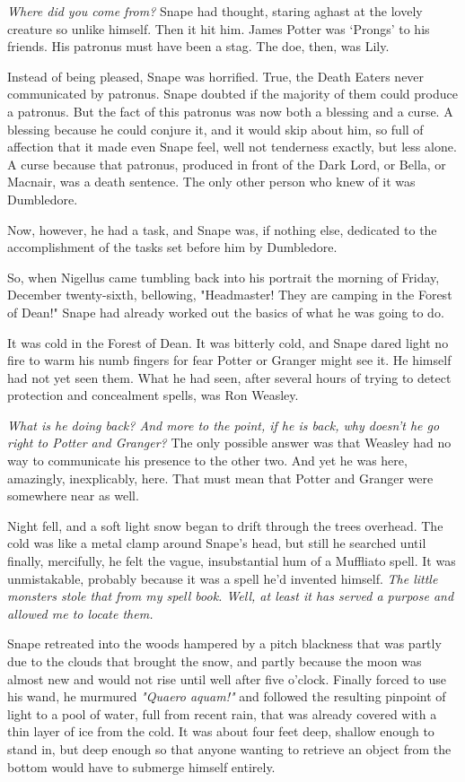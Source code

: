 \documentclass[a4paper,11pt]{article}
\begin{document}
\emph{Where did you come from?} Snape had thought, staring aghast at the lovely creature so unlike himself. Then it hit him. James Potter was `Prongs' to his friends. His patronus must have been a stag. The doe, then, was Lily.

Instead of being pleased, Snape was horrified. True, the Death Eaters never communicated by patronus. Snape doubted if the majority of them could produce a patronus. But the fact of this patronus was now both a blessing and a curse. A blessing because he could conjure it, and it would skip about him, so full of affection that it made even Snape feel, well not tenderness exactly, but less alone. A curse because that patronus, produced in front of the Dark Lord, or Bella, or Macnair, was a death sentence. The only other person who knew of it was Dumbledore.

Now, however, he had a task, and Snape was, if nothing else, dedicated to the accomplishment of the tasks set before him by Dumbledore.

So, when Nigellus came tumbling back into his portrait the morning of Friday, December twenty-sixth, bellowing, "Headmaster! They are camping in the Forest of Dean!" Snape had already worked out the basics of what he was going to do.

It was cold in the Forest of Dean. It was bitterly cold, and Snape dared light no fire to warm his numb fingers for fear Potter or Granger might see it. He himself had not yet seen them. What he had seen, after several hours of trying to detect protection and concealment spells, was Ron Weasley.

\emph{What is he doing back? And more to the point, if he is back, why doesn't he go right to Potter and Granger?} The only possible answer was that Weasley had no way to communicate his presence to the other two. And yet he was here, amazingly, inexplicably, here. That must mean that Potter and Granger were somewhere near as well.

Night fell, and a soft light snow began to drift through the trees overhead. The cold was like a metal clamp around Snape's head, but still he searched until finally, mercifully, he felt the vague, insubstantial hum of a Muffliato spell. It was unmistakable, probably because it was a spell he'd invented himself. \emph{The little monsters stole that from my spell book. Well, at least it has served a purpose and allowed me to locate them.}

Snape retreated into the woods hampered by a pitch blackness that was partly due to the clouds that brought the snow, and partly because the moon was almost new and would not rise until well after five o'clock. Finally forced to use his wand, he murmured \emph{"Quaero aquam!"} and followed the resulting pinpoint of light to a pool of water, full from recent rain, that was already covered with a thin layer of ice from the cold. It was about four feet deep, shallow enough to stand in, but deep enough so that anyone wanting to retrieve an object from the bottom would have to submerge himself entirely.
\end{document}
